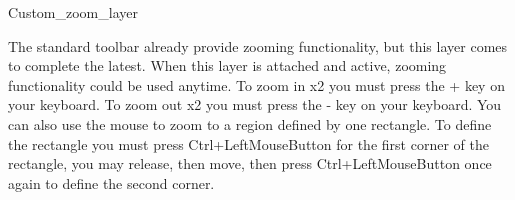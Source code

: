 
\begin{ccRefClass}{Custom_zoom_layer}


\ccInheritsFrom
{}

\ccGlue

\ccCreation
{}


The standard toolbar already provide zooming functionality, but this layer
 comes to complete the latest.
When this layer is attached and active, zooming functionality could be used anytime. To zoom in x2 you must press the + key on your keyboard. To zoom 
out x2 you must press the - key on your keyboard. You can also use the mouse
 to zoom to a region defined by one rectangle. To define the rectangle you 
must press Ctrl+LeftMouseButton for the first corner of the rectangle, you 
may release, then move, then press Ctrl+LeftMouseButton once again to define 
the second corner.


\end{ccRefClass}




